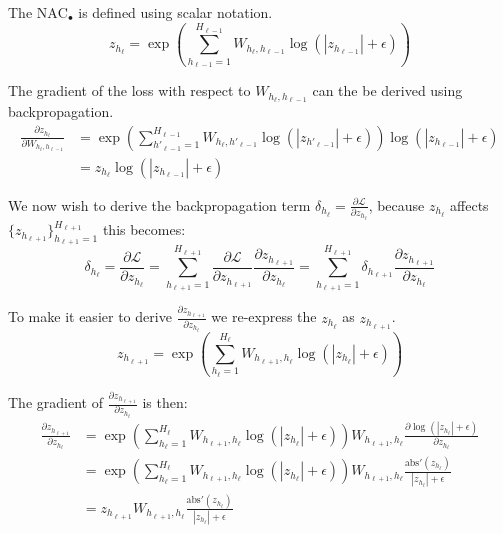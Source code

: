 The $\textrm{NAC}_\bullet$ is defined using scalar notation.
\begin{equation}
z_{h_\ell} = \exp\left(\sum_{h_{\ell-1}=1}^{H_{\ell-1}} W_{h_{\ell}, h_{\ell-1}} \log(|z_{h_{\ell-1}}| + \epsilon) \right)
\end{equation}

The gradient of the loss with respect to $W_{h_\ell, h_{\ell-1}}$ can the be derived using backpropagation.
\begin{equation}
\begin{aligned}
\frac{\partial z_{h_\ell}}{\partial W_{h_\ell, h_{\ell-1}}} &= \exp\left(\sum_{h'_{\ell-1}=1}^{H_{\ell-1}} W_{h_{\ell}, h'_{\ell-1}} \log(|z_{h'_{\ell-1}}| + \epsilon) \right) \log(|z_{h_{\ell-1}}| + \epsilon) \\
&= z_{h_\ell} \log(|z_{h_{\ell-1}}| + \epsilon)
\end{aligned}
\end{equation}

We now wish to derive the backpropagation term $\delta_{h_\ell} = \frac{\partial \mathcal{L}}{\partial z_{h_\ell}}$, because $z_{h_\ell}$ affects $\{z_{h_{\ell+1}}\}_{h_{\ell+1}=1}^{H_{\ell+1}}$ this becomes:
\begin{equation}
\delta_{h_\ell} = \frac{\partial \mathcal{L}}{\partial z_{h_\ell}} = \sum_{h_{\ell+1}=1}^{H_{\ell+1}} \frac{\partial \mathcal{L}}{\partial z_{h_{\ell+1}}} \frac{\partial z_{h_{\ell+1}}}{\partial z_{h_\ell}} = \sum_{h_{\ell+1}=1}^{H_{\ell+1}} \delta_{h_{\ell+1}} \frac{\partial z_{h_{\ell+1}}}{\partial z_{h_\ell}}
\end{equation}

To make it easier to derive $\frac{\partial z_{h_{\ell+1}}}{\partial z_{h_\ell}}$ we re-express the $z_{h_\ell}$ as $z_{h_{\ell+1}}$.
\begin{equation}
z_{h_{\ell+1}} = \exp\left(\sum_{h_{\ell}=1}^{H_{\ell}} W_{h_{\ell+1}, h_{\ell}} \log(|z_{h_{\ell}}| + \epsilon) \right)
\end{equation}

The gradient of $\frac{\partial z_{h_{\ell+1}}}{\partial z_{h_\ell}}$ is then:
\begin{equation}
\begin{aligned}
\frac{\partial z_{h_{\ell+1}}}{\partial z_{h_\ell}} &= \exp\left(\sum_{h_{\ell}=1}^{H_{\ell}} W_{h_{\ell+1}, h_{\ell}} \log(|z_{h_{\ell}}| + \epsilon) \right) W_{h_{\ell+1}, h_{\ell}} \frac{\partial \log(|z_{h_{\ell}}| + \epsilon)}{\partial z_{h_\ell}} \\
&= \exp\left(\sum_{h_{\ell}=1}^{H_{\ell}} W_{h_{\ell+1}, h_{\ell}} \log(|z_{h_{\ell}}| + \epsilon) \right) W_{h_{\ell+1}, h_{\ell}} \frac{\mathrm{abs}'(z_{h_{\ell}})}{|z_{h_{\ell}}| + \epsilon} \\
&= z_{h_{\ell+1}} W_{h_{\ell+1}, h_{\ell}} \frac{\mathrm{abs}'(z_{h_{\ell}})}{|z_{h_{\ell}}| + \epsilon} 
\end{aligned}
\end{equation}

